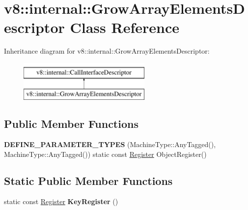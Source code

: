\hypertarget{classv8_1_1internal_1_1GrowArrayElementsDescriptor}{}\section{v8\+:\+:internal\+:\+:Grow\+Array\+Elements\+Descriptor Class Reference}
\label{classv8_1_1internal_1_1GrowArrayElementsDescriptor}
Inheritance diagram for v8\+:\+:internal\+:\+:Grow\+Array\+Elements\+Descriptor\+:\begin{figure}[H]
\begin{center}
\leavevmode
\includegraphics[height=2.000000cm]{classv8_1_1internal_1_1GrowArrayElementsDescriptor}
\end{center}
\end{figure}
\subsection*{Public Member Functions}
\begin{DoxyCompactItemize}
\item 
\mbox{\label{classv8_1_1internal_1_1GrowArrayElementsDescriptor_abcce2b55ae7de524e6e563cef2e9ae5d}} 
{\bfseries D\+E\+F\+I\+N\+E\+\_\+\+P\+A\+R\+A\+M\+E\+T\+E\+R\+\_\+\+T\+Y\+P\+ES} (Machine\+Type\+::\+Any\+Tagged(), Machine\+Type\+::\+Any\+Tagged()) static const \mbox{\hyperlink{classv8_1_1internal_1_1Register}{Register}} Object\+Register()
\end{DoxyCompactItemize}
\subsection*{Static Public Member Functions}
\begin{DoxyCompactItemize}
\item 
\mbox{\label{classv8_1_1internal_1_1GrowArrayElementsDescriptor_a59ef70fe74eecf53cabef8fd555047b2}} 
static const \mbox{\hyperlink{classv8_1_1internal_1_1Register}{Register}} {\bfseries Key\+Register} ()
\end{DoxyCompactItemize}
